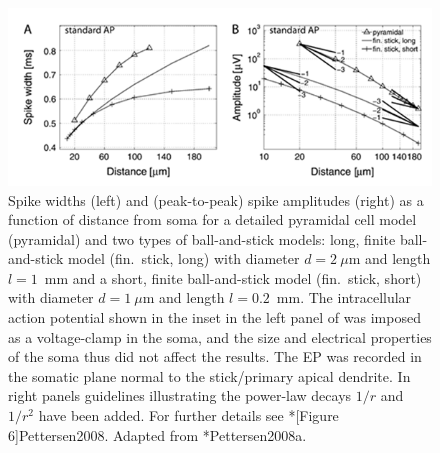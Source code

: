 \begin{figure}[!ht]
\begin{center}
\includegraphics{Figures/Spikes/Spikes-ball-and-stick-results-w100-r150}
\end{center}
\caption[]{
Spike widths (left) and (peak-to-peak) spike amplitudes (right) as a function of distance from soma for a detailed pyramidal cell model (pyramidal) and two types of ball-and-stick models: long, finite ball-and-stick model (fin.~stick, long) with diameter $d=2~\mu$m and length $l=1$~mm and a short, finite ball-and-stick model (fin.~stick, short) with diameter $d=1~\mu$m and length $l=0.2$~mm. The intracellular action potential shown in the inset in the left panel of  was imposed as a voltage-clamp in the soma, and the size and electrical properties of the soma thus did not affect the results. The EP was recorded in the somatic plane normal to the stick/primary apical dendrite. In right panels guidelines illustrating the power-law decays $1/r$ and $1/r^{2}$ have been added. For further details see \citeasnoun**[Figure 6]{Pettersen2008}.   Adapted from \citeasnoun**{Pettersen2008a}.  
}
\label{fig:Spikes:ball-and-stick-results}
\end{figure}


%

